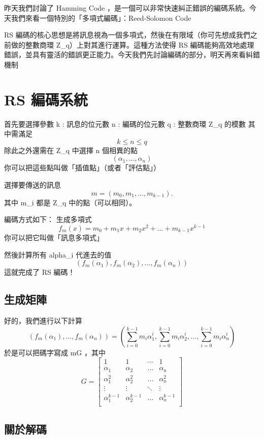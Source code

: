 \documentclass[
]{article}
\author{}
\date{}
\begin{document}
昨天我們討論了 Hamming Code
，是一個可以非常快速糾正錯誤的編碼系統。今天我們來看一個特別的「多項式編碼」：Reed-Solomon
Code

RS
編碼的核心思想是將訊息視為一個多項式，然後在有限域（你可先想成我們之前做的整數商環
Z\_q）上對其進行運算。這種方法使得 RS
編碼能夠高效地處理錯誤，並具有靈活的錯誤更正能力。今天我們先討論編碼的部分，明天再來看糾錯機制

\hypertarget{rs-ux7de8ux78bcux7cfbux7d71}{%
\section{RS 編碼系統}\label{rs-ux7de8ux78bcux7cfbux7d71}}

首先要選擇參數 k : 訊息的位元數 n : 編碼的位元數 q : 整數商環 Z\_q
的模數 其中需滿足 \[
k\leq n\leq q
\] 除此之外還需在 Z\_q 中選擇 n 個相異的點 \[
(\alpha_{1},\dots,\alpha_{n})
\] 你可以把這些點叫做「插值點」（或者「評估點」）

選擇要傳送的訊息 \[
m = (m_{0},m_{1},\dots,m_{k-1}).
\] 其中 m\_i 都是 Z\_q 中的點（可以相同）。

編碼方式如下： 生成多項式 \[
f_{m}(x) = m_{0}+m_{1}x+m_{2}x^{2}+\dots+m_{k-1}x^{k-1}
\] 你可以把它叫做「訊息多項式」

然後計算所有 alpha\_i 代進去的值 \[
(f_{m}(\alpha_{1}),f_{m}(\alpha_{2}),\dots,f_{m}(\alpha_{n}))
\] 這就完成了 RS 編碼！

\hypertarget{ux751fux6210ux77e9ux9663}{%
\subsection{生成矩陣}\label{ux751fux6210ux77e9ux9663}}

好的，我們進行以下計算 \[
(f_{m}(\alpha_{1}),\dots,f_{m}(\alpha_{n}))
= 
\left( \sum_{i=0}^{k-1} m_{i}\alpha_{1}^{i},
\sum_{i=0}^{k-1} m_{i}\alpha_{2}^{i},
\dots,
\sum_{i=0}^{k-1} m_{i}\alpha_{n}^{i} \right)
\] 於是可以把碼字寫成 mG ，其中 \[
G = 
\begin{bmatrix}
1  & 1 & \cdots & 1 \\
\alpha_{1} & \alpha_{2} & \dots & \alpha_{n} \\
\alpha_{1}^{2} & \alpha_{2}^{2} & \dots & \alpha_{n}^{2} \\
 \vdots & \vdots & \ddots & \vdots \\
\alpha_{1}^{k-1} & \alpha_{2}^{k-1} & \dots & \alpha_{n}^{k-1} \\
\end{bmatrix}
\]

\hypertarget{ux95dcux65bcux89e3ux78bc}{%
\subsection{關於解碼}\label{ux95dcux65bcux89e3ux78bc}}
\end{document}
